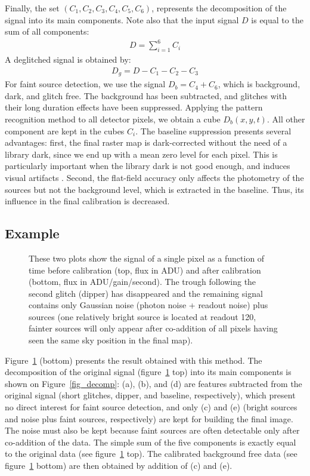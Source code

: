 Finally, the set $(C_1,C_2,C_3,C_4,C_5,C_6)$, represents the
decomposition of the signal into its main components. Note also
that the input signal $D$ is equal to the sum of all components:
\begin{eqnarray}
D = \sum_{i=1}^{6} C_i
\end{eqnarray}
A deglitched signal is obtained by:
\begin{eqnarray}
D_g = D - C_1 - C_2 - C_3
\end{eqnarray}
For   faint source detection, we use the signal $D_b = C_4 + C_6$,
which is background, dark, and glitch free. The background has been
subtracted, and glitches with their long duration effects have been
suppressed. Applying the pattern recognition method to all detector
pixels, we obtain a cube $D_b(x,y,t)$. All other component are kept in
the cubes $C_i$.  The baseline suppression presents several
advantages: first, the final raster map is dark-corrected
without the need of a library dark, since we end up with a mean zero
level for each pixel.  This is particularly important when the library
dark is not good enough, and induces visual artifacts    
\cite{starck:sta99_1}. Second, the flat-field accuracy only affects 
the photometry
of the sources but not the background level, which is extracted in the
baseline. Thus, its influence in the final calibration is decreased.


\subsection*{Example}
\begin{figure}[htb]
\centerline{ \vbox{
}}
\caption{These two plots show the signal of a single pixel as a function of time 
before calibration (top, flux in ADU) and after calibration (bottom, flux in 
ADU/gain/second). The trough following the second glitch (dipper) has 
disappeared and the remaining signal contains only Gaussian noise (photon noise 
+ readout noise) plus sources (one relatively bright source is located at 
readout 120, fainter sources will only appear after co-addition of all pixels 
having seen the same sky position in the final map).}
\label{fig_calib}
\end{figure}

Figure~\ref{fig_calib} (bottom) presents the result obtained with this
method. The decomposition of the original signal
(figure~\ref{fig_calib} top) into its main components is shown on
Figure~\ref{fig_decomp}: (a), (b), and (d) are features subtracted
from the original signal (short glitches, dipper, and
baseline, respectively), which present no direct interest for faint source
detection, and only (c) and (e) (bright sources and noise plus
faint sources, respectively) are kept for building the final image. 
The noise must also be kept because faint sources are often detectable 
only after co-addition of the data.  The
simple sum of the five components is exactly equal to the original
data (see figure~\ref{fig_calib} top). The calibrated background free
data (see figure~\ref{fig_calib} bottom) are then obtained by addition
of (c) and (e).

